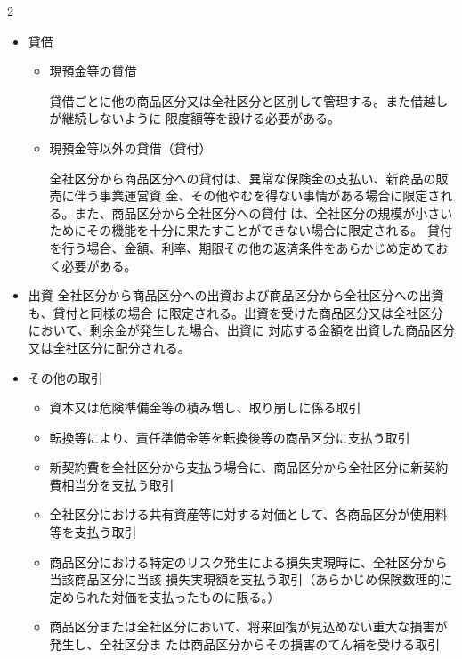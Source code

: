 2\documentclass[report,gutter=10mm,fore-edge=10mm,uplatex,dvipdfmx]{jlreq}
\begin{document}
\begin{itemize}
\item[] 貸借
\begin{itemize}
\item[] 現預金等の貸借\par
貸借ごとに他の商品区分又は全社区分と区別して管理する。また借越しが継続しないように
限度額等を設ける必要がある。
\item[] 現預金等以外の貸借（貸付）\par
全社区分から商品区分への貸付は、異常な保険金の支払い、新商品の販売に伴う事業運営資
金、その他やむを得ない事情がある場合に限定される。また、商品区分から全社区分への貸付
は、全社区分の規模が小さいためにその機能を十分に果たすことができない場合に限定される。
貸付を行う場合、金額、利率、期限その他の返済条件をあらかじめ定めておく必要がある。
\end{itemize}
\item[] 出資
全社区分から商品区分への出資および商品区分から全社区分への出資も、貸付と同様の場合
に限定される。出資を受けた商品区分又は全社区分において、剰余金が発生した場合、出資に
対応する金額を出資した商品区分又は全社区分に配分される。
\item[] その他の取引
\begin{itemize}
\item[] 資本又は危険準備金等の積み増し、取り崩しに係る取引
\item[] 転換等により、責任準備金等を転換後等の商品区分に支払う取引
\item[] 新契約費を全社区分から支払う場合に、商品区分から全社区分に新契約費相当分を支払う取引
\item[] 全社区分における共有資産等に対する対価として、各商品区分が使用料等を支払う取引
\item[] 商品区分における特定のリスク発生による損失実現時に、全社区分から当該商品区分に当該
損失実現額を支払う取引（あらかじめ保険数理的に定められた対価を支払ったものに限る。）
\item[] 商品区分または全社区分において、将来回復が見込めない重大な損害が発生し、全社区分ま
たは商品区分からその損害のてん補を受ける取引
\end{itemize}
\end{itemize}
\end{document}
